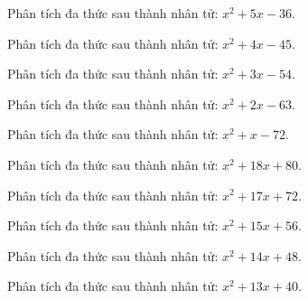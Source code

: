 \begin{bt}
	Phân tích đa thức sau thành nhân tử: $x^2 + 5 x - 36$.
\end{bt}
\begin{bt}
	Phân tích đa thức sau thành nhân tử: $x^2 + 4 x - 45$.
\end{bt}
\begin{bt}
	Phân tích đa thức sau thành nhân tử: $x^2 + 3 x - 54$.
\end{bt}
\begin{bt}
	Phân tích đa thức sau thành nhân tử: $x^2 + 2 x - 63$.
\end{bt}
\begin{bt}
	Phân tích đa thức sau thành nhân tử: $x^2 + x - 72$.
\end{bt}
\begin{bt}
	Phân tích đa thức sau thành nhân tử: $x^2 + 18 x + 80$.
\end{bt}
\begin{bt}
	Phân tích đa thức sau thành nhân tử: $x^2 + 17 x + 72$.
\end{bt}
\begin{bt}
	Phân tích đa thức sau thành nhân tử: $x^2 + 15 x + 56$.
\end{bt}
\begin{bt}
	Phân tích đa thức sau thành nhân tử: $x^2 + 14 x + 48$.
\end{bt}
\begin{bt}
	Phân tích đa thức sau thành nhân tử: $x^2 + 13 x + 40$.
\end{bt}
